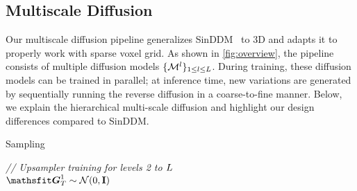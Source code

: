 \vspace*{2mm}
\subsection{Multiscale Diffusion}\label{sec:model}
Our multiscale diffusion pipeline generalizes SinDDM~\cite{kulikov2023sinddm} to 3D and adapts it to properly work with sparse voxel grid. 
As shown in \cref{fig:overview}, the pipeline consists of multiple diffusion models \(\{\mathcal{M}^l\}_{1\leq l \leq L}\).
During training, these diffusion models can be trained in parallel; at inference time, new variations are generated by sequentially running the reverse diffusion in a coarse-to-fine manner.
Below, we explain the hierarchical multi-scale diffusion and highlight our design differences compared to SinDDM.

\begin{algorithm}
    \caption{Sampling}
    \label{alg:reverse-diffusion}

     \emph{// Upsampler training for levels 2 to $L$}\\
    $\grid_T^{1} \sim \mathcal{N}(0, \mathbf{I})$\\

\end{algorithm}

